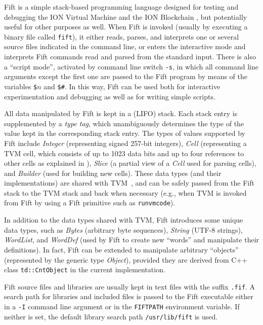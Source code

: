 \documentclass[12pt,oneside]{article}
\begin{document}
Fift is a simple stack-based programming language designed for testing and debugging the ION Virtual Machine \cite{TVM} and the ION Blockchain \cite{TBC}, but potentially useful for other purposes as well. When Fift is invoked (usually by executing a binary file called {\tt fift}), it either reads, parses, and interprets one or several source files indicated in the command line, or enters the interactive mode and interprets Fift commands read and parsed from the standard input. There is also a ``script mode'', activated by command line switch {\tt -s}, in which all command line arguments except the first one are passed to the Fift program by means of the variables {\tt \$$n$} and {\tt \$\#}. In this way, Fift can be used both for interactive experimentation and debugging as well as for writing simple scripts.

All data manipulated by Fift is kept in a (LIFO) stack. Each stack entry is supplemented by a {\em type tag}, which unambiguously determines the type of the value kept in the corresponding stack entry. The types of values supported by Fift include {\em Integer\/} (representing signed 257-bit integers), {\em Cell\/} (representing a TVM cell, which consists of up to 1023 data bits and up to four references to other cells as explained in \cite{TVM}), {\em Slice\/} (a partial view of a {\em Cell\/} used for parsing cells), and {\em Builder\/} (used for building new cells). These data types (and their implementations) are shared with TVM~\cite{TVM}, and can be safely passed from the Fift stack to the TVM stack and back when necessary (e.g., when TVM is invoked from Fift by using a Fift primitive such as {\tt runvmcode}).

In addition to the data types shared with TVM, Fift introduces some unique data types, such as {\em Bytes\/} (arbitrary byte sequences), {\em String\/} (UTF-8 strings), {\em WordList\/}, and {\em WordDef\/} (used by Fift to create new ``words'' and manipulate their definitions). In fact, Fift can be extended to manipulate arbitrary ``objects'' (represented by the generic type {\em Object}), provided they are derived from C++ class {\tt td::CntObject} in the current implementation.

Fift source files and libraries are usually kept in text files with the suffix {\tt .fif}. A search path for libraries and included files is passed to the Fift executable either in a {\tt -I} command line argument or in the {\tt FIFTPATH} environment variable. If neither is set, the default library search path {\tt /usr/lib/fift} is used.
\end{document}
